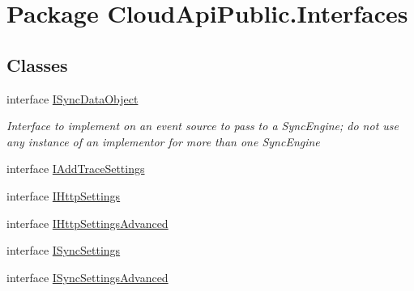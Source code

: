 \hypertarget{namespace_cloud_api_public_1_1_interfaces}{\section{Package Cloud\-Api\-Public.\-Interfaces}
\label{namespace_cloud_api_public_1_1_interfaces}
}
\subsection*{Classes}
\begin{DoxyCompactItemize}
\item 
interface \hyperlink{interface_cloud_api_public_1_1_interfaces_1_1_i_sync_data_object}{I\-Sync\-Data\-Object}
\begin{DoxyCompactList}\small\item\em Interface to implement on an event source to pass to a Sync\-Engine; do not use any instance of an implementor for more than one Sync\-Engine \end{DoxyCompactList}\item 
interface \hyperlink{interface_cloud_api_public_1_1_interfaces_1_1_i_add_trace_settings}{I\-Add\-Trace\-Settings}
\item 
interface \hyperlink{interface_cloud_api_public_1_1_interfaces_1_1_i_http_settings}{I\-Http\-Settings}
\item 
interface \hyperlink{interface_cloud_api_public_1_1_interfaces_1_1_i_http_settings_advanced}{I\-Http\-Settings\-Advanced}
\item 
interface \hyperlink{interface_cloud_api_public_1_1_interfaces_1_1_i_sync_settings}{I\-Sync\-Settings}
\item 
interface \hyperlink{interface_cloud_api_public_1_1_interfaces_1_1_i_sync_settings_advanced}{I\-Sync\-Settings\-Advanced}
\end{DoxyCompactItemize}
